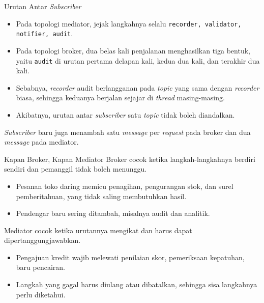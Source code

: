 \documentclass[aspectratio=169, table, 12pt]{beamer}
\begin{document}
\begin{frame}{{\Large Urutan Antar \textit{Subscriber}}}
  \vspace{10pt}
  \begin{itemize}\small
    \item Pada topologi mediator, jejak langkahnya selalu \texttt{recorder,
          validator, notifier, audit}.
    \item Pada topologi broker, dua belas kali penjalanan menghasilkan tiga
          bentuk, yaitu \texttt{audit} di urutan pertama delapan kali, kedua
          dua kali, dan terakhir dua kali.
    \item Sebabnya, \textit{recorder} audit berlangganan pada \textit{topic} yang sama dengan
          \textit{recorder} biasa, sehingga keduanya berjalan sejajar di \textit{thread}
          masing-masing.
    \item Akibatnya, urutan antar \textit{subscriber} satu \textit{topic} tidak boleh diandalkan.
  \end{itemize}

  \vspace{10pt}
  {\small \textit{Subscriber} baru juga menambah satu \textit{message} per \textit{request} pada broker dan
  dua \textit{message} pada mediator.}
\end{frame}

\begin{frame}{{\Large Kapan Broker, Kapan Mediator}}
  \vspace{8pt}
  {\small Broker cocok ketika langkah-langkahnya berdiri sendiri dan pemanggil
  tidak boleh menunggu.}
  \begin{itemize}\small
    \item Pesanan toko daring memicu penagihan, pengurangan stok, dan surel
          pemberitahuan, yang tidak saling membutuhkan hasil.
    \item Pendengar baru sering ditambah, misalnya audit dan analitik.
  \end{itemize}

  \vspace{6pt}
  {\small Mediator cocok ketika urutannya mengikat dan harus dapat
  dipertanggungjawabkan.}
  \begin{itemize}\small
    \item Pengajuan kredit wajib melewati penilaian skor, pemeriksaan
          kepatuhan, baru pencairan.
    \item Langkah yang gagal harus diulang atau dibatalkan, sehingga sisa
          langkahnya perlu diketahui.
  \end{itemize}
\end{frame}
\end{document}
